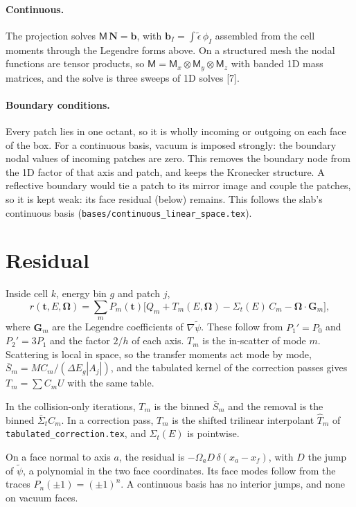 \documentclass[11pt]{article}
\newcommand{\tpsi}{\tilde\psi}
\newcommand{\teps}{\tilde\epsilon}
\newcommand{\Sbar}{\bar S}
\newcommand{\Sigt}{\Sigma_t}
\newcommand{\Om}{\boldsymbol\Omega}
\newcommand{\tb}{\mathbf t}
\begin{document}
\paragraph{Continuous.} The projection solves $\mathsf M\,\mathbf N = \mathbf b$, with
$\mathbf b_I = \int\teps\,\phi_I$ assembled from the cell moments through the
Legendre forms above. On a structured mesh the nodal functions are tensor products,
so $\mathsf M = \mathsf M_x\otimes\mathsf M_y\otimes\mathsf M_z$ with banded 1D mass
matrices, and the solve is three sweeps of 1D solves [7].

\paragraph{Boundary conditions.} Every patch lies in one octant, so it is wholly
incoming or outgoing on each face of the box. For a continuous basis, vacuum is
imposed strongly: the boundary nodal values of incoming patches are zero. This
removes the boundary node from the 1D factor of that axis and patch, and keeps the
Kronecker structure. A reflective boundary would tie a patch to its mirror image
and couple the patches, so it is kept weak: its face residual (below) remains. This
follows the slab's continuous basis (\texttt{bases/continuous\_linear\_space.tex}).

\section{Residual}

Inside cell $k$, energy bin $g$ and patch $j$,
\begin{equation}
  r(\tb,E,\Om) = \sum_m P_m(\tb)\Big[Q_m + T_m(E,\Om) - \Sigt(E)\,C_m
     - \Om\cdot\mathbf G_m\Big],
\end{equation}
where $\mathbf G_m$ are the Legendre coefficients of $\nabla\tpsi$. These follow from
$P_1'=P_0$ and $P_2'=3P_1$ and the factor $2/h$ of each axis. $T_m$ is the in-scatter
of mode $m$. Scattering is local in space, so the transfer moments act mode by mode,
$\Sbar_m = M C_m/(\Delta E_g|A_j|)$, and the tabulated kernel of the correction passes
gives $T_m=\sum C_m U$ with the same table.

In the collision-only iterations, $T_m$ is the binned $\Sbar_m$ and the removal is
the binned $\bar\Sigma_t C_m$. In a correction pass, $T_m$ is the shifted trilinear
interpolant $\hat T_m$ of \texttt{tabulated\_correction.tex}, and $\Sigt(E)$ is
pointwise.

On a face normal to axis $a$, the residual is $-\Omega_a D\,\delta(x_a-x_f)$, with
$D$ the jump of $\tpsi$, a polynomial in the two face coordinates. Its face modes
follow from the traces $P_n(\pm1)=(\pm1)^n$. A continuous basis has no interior
jumps, and none on vacuum faces.
\end{document}
